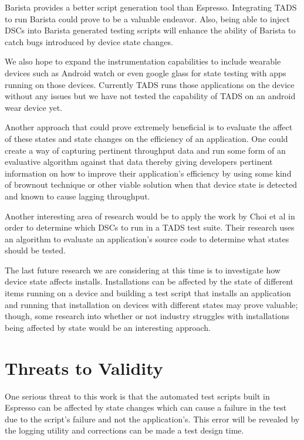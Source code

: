 Barista \cite{7927971} provides a better script generation tool than Espresso.  Integrating TADS to run Barista could prove to be a valuable endeavor. Also, being able to inject DSCs into Barista generated testing scripts will enhance the ability of Barista to catch bugs introduced by device state changes.  

We also hope to expand the instrumentation capabilities to include wearable devices such as Android watch or even google glass for state testing with apps running on those devices.  Currently TADS runs those applications on the device without any issues but we have not tested the capability of TADS on an android wear device yet.

Another approach that could prove extremely beneficial is to evaluate the affect of these states and state changes on the efficiency of an application. One could create a way of capturing pertinent throughput data and run some form of an evaluative algorithm against that data thereby giving developers pertinent information on how to improve their application's efficiency by using some kind of brownout technique \cite{Klein:2014:BBM:2568225.2568227} or other viable solution when that device state is detected and known to cause lagging throughput. 

Another interesting area of research would be to apply the work by Choi et al \cite{Choi:2013:GGT:2544173.2509552} in order to determine which DSCs to run in a TADS test suite.  Their research uses an algorithm to evaluate an application's source code to determine what states should be tested.  

The last future research we are considering at this time is to investigate how device state affects installs.  Installations can be affected by the state of different items running on a device and building a test script that installs an application and running that installation on devices with different states may prove valuable; though, some research into whether or not industry struggles with installations being affected by state would be an interesting approach.  




\section{Threats to Validity}
One serious threat to this work is that the automated test scripts built in Espresso can be affected by state changes \cite{7927971} which can cause a failure in the test due to the script's failure and not the application's.  This error will be revealed by the logging utility and corrections can be made a test design time.  


